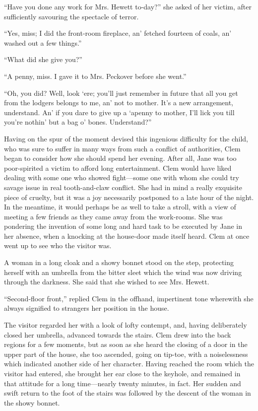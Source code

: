 ``Have you done any work for Mrs. Hewett to-day?'' she asked of her
victim, after sufficiently savouring the spectacle of terror.

{}``Yes, miss; I did the front-room fireplace, an' fetched fourteen of
coals, an' washed out a few things.''

``What did she give you?''

``A penny, miss. I gave it to Mrs. Peckover before she went.''

``Oh, you did? Well, look `ere; you'll just remember in future that all
you get from the lodgers belongs to me, an' not to mother. It's a new
arrangement, understand. An' if you dare to give up a `apenny to mother,
I'll lick you till you're nothin' but a bag o' bones. Understand?''

Having on the spur of the moment devised this ingenious difficulty for
the child, who was sure to suffer in many ways from such a conflict of
authorities, Clem began to consider how she should spend her evening.
After all, Jane was too poor-spirited a victim to afford long
entertainment. Clem would have liked dealing with some one who showed
fight---some one with whom she could try savage issue in real
tooth-and-claw conflict. She had in mind a really exquisite piece {}of
cruelty, but it was a joy necessarily postponed to a late hour of the
night. In the meantime, it would perhaps be as well to take a stroll,
with a view of meeting a few friends as they came away from the
work-rooms. She was pondering the invention of some long and hard task
to be executed by Jane in her absence, when a knocking at the house-door
made itself heard. Clem at once went up to see who the visitor was.

A woman in a long cloak and a showy bonnet stood on the step, protecting
herself with an umbrella from the bitter sleet which the wind was now
driving through the darkness. She said that she wished to see Mrs.
Hewett.

``Second-floor front,'' replied Clem in the offhand, impertinent tone
wherewith she always signified to strangers her position in the house.

The visitor regarded her with a look of lofty contempt, and, having
deliberately closed her umbrella, advanced towards the stairs. Clem drew
into the back regions for {}a few moments, but as soon as she heard the
closing of a door in the upper part of the house, she too ascended,
going on tip-toe, with a noiselessness which indicated another side of
her character. Having reached the room which the visitor had entered,
she brought her ear close to the keyhole, and remained in that attitude
for a long time---nearly twenty minutes, in fact. Her sudden and swift
return to the foot of the stairs was followed by the descent of the
woman in the showy bonnet.

